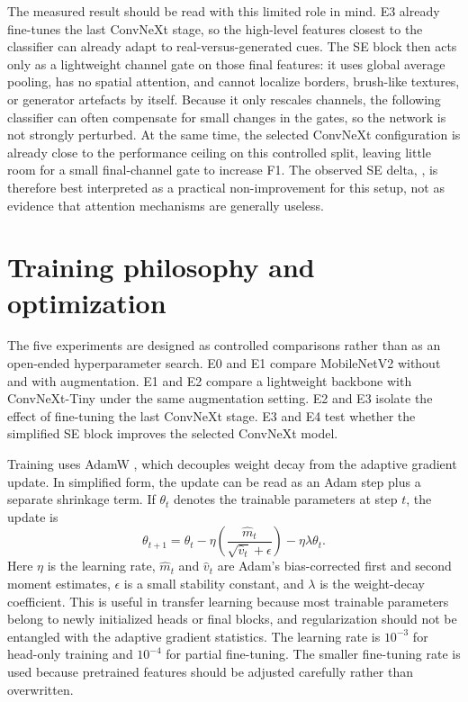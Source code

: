 \documentclass[11pt,a4paper]{article}
\begin{document}
The measured result should be read with this limited role in mind. E3 already
fine-tunes the last ConvNeXt stage, so the high-level features closest to the
classifier can already adapt to real-versus-generated cues. The SE block then
acts only as a lightweight channel gate on those final features: it uses global
average pooling, has no spatial attention, and cannot localize borders,
brush-like textures, or generator artefacts by itself. Because it only rescales
channels, the following classifier can often compensate for small changes in
the gates, so the network is not strongly perturbed. At the same time, the
selected ConvNeXt configuration is already close to the performance ceiling on
this controlled split, leaving little room for a small final-channel gate to
increase F1. The observed SE delta, \AttentionDelta, is therefore best
interpreted as a practical non-improvement for this setup, not as evidence
that attention mechanisms are generally useless.

\section{Training philosophy and optimization}

The five experiments are designed as controlled comparisons rather than as an
open-ended hyperparameter search. E0 and E1 compare MobileNetV2 without and
with augmentation. E1 and E2 compare a lightweight backbone with ConvNeXt-Tiny
under the same augmentation setting. E2 and E3 isolate the effect of
fine-tuning the last ConvNeXt stage. E3 and E4 test whether the simplified SE
block improves the selected ConvNeXt model.

Training uses AdamW \cite{loshchilov2019adamw}, which decouples weight decay
from the adaptive gradient update. In simplified form, the update can be read
as an Adam step plus a separate shrinkage term. If \(\theta_t\) denotes the
trainable parameters at step \(t\), the update is
\[
  \theta_{t+1}
  =
  \theta_t
  - \eta
  \left(
    \frac{\hat{m}_t}{\sqrt{\hat{v}_t}+\epsilon}
  \right)
  - \eta\lambda\theta_t .
\]
Here \(\eta\) is the learning rate, \(\hat{m}_t\) and \(\hat{v}_t\) are Adam's
bias-corrected first and second moment estimates, \(\epsilon\) is a small
stability constant, and \(\lambda\) is the weight-decay coefficient. This is
useful in transfer learning because most trainable parameters belong to newly
initialized heads or final blocks, and regularization should not be entangled
with the adaptive gradient statistics. The learning rate is \(10^{-3}\) for
head-only training and \(10^{-4}\) for partial fine-tuning. The smaller
fine-tuning rate is used because pretrained features should be adjusted
carefully rather than overwritten.
\end{document}
